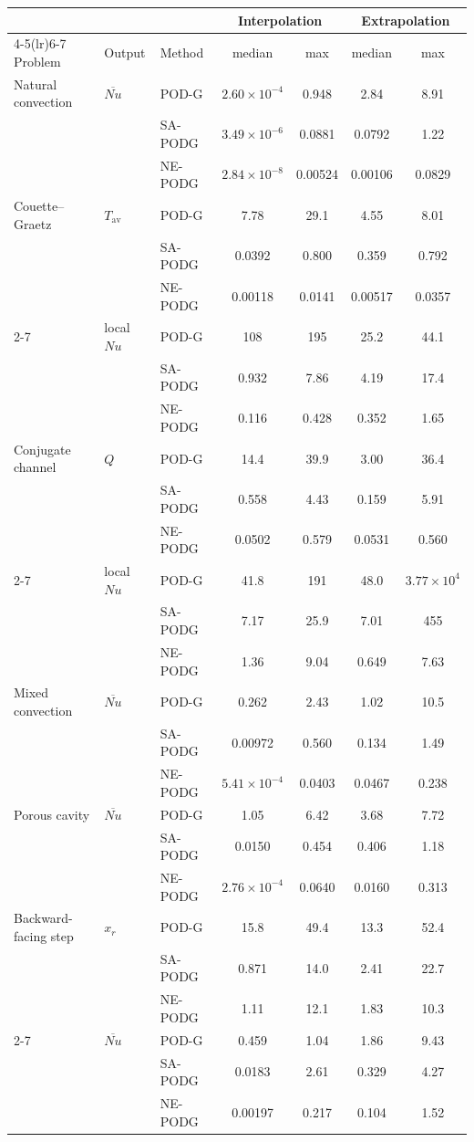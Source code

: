 \begin{tabular}{lllcccc}
\toprule
 & & & \multicolumn{2}{c}{Interpolation} & \multicolumn{2}{c}{Extrapolation} \\
\cmidrule(lr){4-5}\cmidrule(lr){6-7}
Problem & Output & Method & median & max & median & max \\
\midrule
Natural convection & $\overline{Nu}$ & POD-G & $2.60\times10^{-4}$ & 0.948 & 2.84 & 8.91 \\
 &  & SA-PODG & $3.49\times10^{-6}$ & 0.0881 & 0.0792 & 1.22 \\
 &  & NE-PODG & $2.84\times10^{-8}$ & 0.00524 & 0.00106 & 0.0829 \\
\midrule
Couette--Graetz & $T_{\mathrm{av}}$ & POD-G & 7.78 & 29.1 & 4.55 & 8.01 \\
 &  & SA-PODG & 0.0392 & 0.800 & 0.359 & 0.792 \\
 &  & NE-PODG & 0.00118 & 0.0141 & 0.00517 & 0.0357 \\
\cmidrule(lr){2-7}
 & local $Nu$ & POD-G & 108 & 195 & 25.2 & 44.1 \\
 &  & SA-PODG & 0.932 & 7.86 & 4.19 & 17.4 \\
 &  & NE-PODG & 0.116 & 0.428 & 0.352 & 1.65 \\
\midrule
Conjugate channel & $Q$ & POD-G & 14.4 & 39.9 & 3.00 & 36.4 \\
 &  & SA-PODG & 0.558 & 4.43 & 0.159 & 5.91 \\
 &  & NE-PODG & 0.0502 & 0.579 & 0.0531 & 0.560 \\
\cmidrule(lr){2-7}
 & local $Nu$ & POD-G & 41.8 & 191 & 48.0 & $3.77\times10^{4}$ \\
 &  & SA-PODG & 7.17 & 25.9 & 7.01 & 455 \\
 &  & NE-PODG & 1.36 & 9.04 & 0.649 & 7.63 \\
\midrule
Mixed convection & $\overline{Nu}$ & POD-G & 0.262 & 2.43 & 1.02 & 10.5 \\
 &  & SA-PODG & 0.00972 & 0.560 & 0.134 & 1.49 \\
 &  & NE-PODG & $5.41\times10^{-4}$ & 0.0403 & 0.0467 & 0.238 \\
\midrule
Porous cavity & $\overline{Nu}$ & POD-G & 1.05 & 6.42 & 3.68 & 7.72 \\
 &  & SA-PODG & 0.0150 & 0.454 & 0.406 & 1.18 \\
 &  & NE-PODG & $2.76\times10^{-4}$ & 0.0640 & 0.0160 & 0.313 \\
\midrule
Backward-facing step & $x_r$ & POD-G & 15.8 & 49.4 & 13.3 & 52.4 \\
 &  & SA-PODG & 0.871 & 14.0 & 2.41 & 22.7 \\
 &  & NE-PODG & 1.11 & 12.1 & 1.83 & 10.3 \\
\cmidrule(lr){2-7}
 & $\overline{Nu}$ & POD-G & 0.459 & 1.04 & 1.86 & 9.43 \\
 &  & SA-PODG & 0.0183 & 2.61 & 0.329 & 4.27 \\
 &  & NE-PODG & 0.00197 & 0.217 & 0.104 & 1.52 \\
\bottomrule
\end{tabular}
